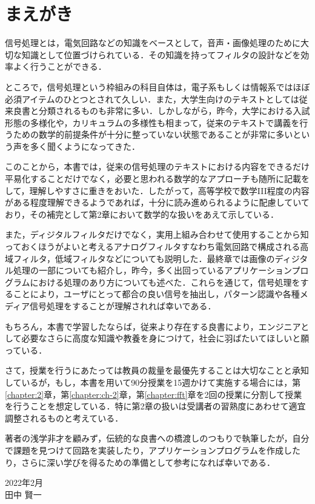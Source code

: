 
\chapter{まえがき}

信号処理とは，電気回路などの知識をベースとして，音声・画像処理のために大切な知識として位置づけられている．その知識を持ってフィルタの設計などを効率よく行うことができる．

ところで，信号処理という枠組みの科目自体は，電子系もしくは情報系ではほぼ必須アイテムのひとつとされて久しい．また，大学生向けのテキストとしては従来良書と分類されるものも非常に多い．しかしながら，昨今，大学における入試形態の多様化や，カリキュラムの多様性も相まって，従来のテキストで講義を行うための数学的前提条件が十分に整っていない状態であることが非常に多いという声を多く聞くようになってきた．

このことから，本書では，従来の信号処理のテキストにおける内容をできるだけ平易化することだけでなく，必要と思われる数学的なアプローチも随所に記載をして，理解しやすさに重きをおいた．したがって，高等学校で数学III程度の内容がある程度理解できるようであれば，十分に読み進められるように配慮していており，その補完として第2章において数学的な扱いをあえて示している．

また，ディジタルフィルタだけでなく，実用上組み合わせて使用することから知っておくほうがよいと考えるアナログフィルタすなわち電気回路で構成される高域フィルタ，低域フィルタなどについても説明した．最終章では画像のディジタル処理の一部についても紹介し，昨今，多く出回っているアプリケーションプログラムにおける処理のあり方についても述べた．これらを通じて，信号処理をすることにより，ユーザにとって都合の良い信号を抽出し，パターン認識や各種メディア信号処理をすることが理解されれば幸いである．

もちろん，本書で学習したならば，従来より存在する良書により，エンジニアとして必要なさらに高度な知識や教養を身につけて，社会に羽ばたいてほしいと願っている．

さて，授業を行うにあたっては教員の裁量を最優先することは大切なことと承知しているが，もし，本書を用いて90分授業を15週かけて実施する場合には，第\ref{chapter:2}章，第\ref{chapter:ch-2}章，第\ref{chapter:fft}章を2回の授業に分割して授業を行うことを想定している．特に第2章の扱いは受講者の習熟度にあわせて適宜調整されるものと考えている．

著者の浅学非才を顧みず，伝統的な良書への橋渡しのつもりで執筆したが，自分で課題を見つけて回路を実装したり，アプリケーションプログラムを作成したり，さらに深い学びを得るための準備として参考になれば幸いである．
\begin{flushright}
2022年2月\\田中 賢一
\end{flushright}

